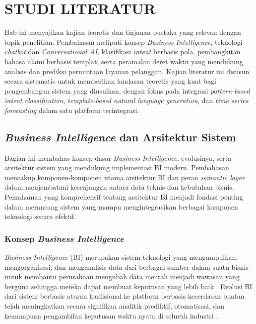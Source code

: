 
\chapter{STUDI LITERATUR}
\label{chap:studi-literatur}

Bab ini menyajikan kajian teoretis dan tinjauan pustaka yang relevan dengan topik penelitian. Pembahasan meliputi konsep \textit{Business Intelligence}, teknologi \textit{chatbot} dan \textit{Conversational AI}, klasifikasi \textit{intent} berbasis pola, pembangkitan bahasa alami berbasis templat, serta peramalan deret waktu yang mendukung analisis dan prediksi permintaan layanan pelanggan. Kajian literatur ini disusun secara sistematis untuk memberikan landasan teoretis yang kuat bagi pengembangan sistem yang diusulkan, dengan fokus pada integrasi \textit{pattern-based intent classification}, \textit{template-based natural language generation}, dan \textit{time series forecasting} dalam satu platform terintegrasi.

\section{\textit{Business Intelligence} dan Arsitektur Sistem}

Bagian ini membahas konsep dasar \textit{Business Intelligence}, evolusinya, serta arsitektur sistem yang mendukung implementasi BI modern. Pembahasan mencakup komponen-komponen utama arsitektur BI dan peran \textit{semantic layer} dalam menjembatani kesenjangan antara data teknis dan kebutuhan bisnis. Pemahaman yang komprehensif tentang arsitektur BI menjadi fondasi penting dalam merancang sistem yang mampu mengintegrasikan berbagai komponen teknologi secara efektif.

\subsection{Konsep \textit{Business Intelligence}}

\textit{Business Intelligence} (BI) merupakan sistem teknologi yang mengumpulkan, mengorganisasi, dan menganalisis data dari berbagai sumber dalam suatu bisnis untuk membantu perusahaan mengubah data mentah menjadi wawasan yang berguna sehingga mereka dapat membuat keputusan yang lebih baik \autocite{sorour2020business}. Evolusi BI dari sistem berbasis aturan tradisional ke platform berbasis kecerdasan buatan telah meningkatkan secara signifikan analitik prediktif, otomatisasi, dan kemampuan pengambilan keputusan waktu nyata di seluruh industri \autocite{khaddam2025ai}.

